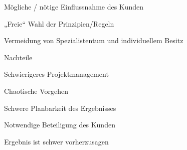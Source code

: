 \documentclass[a4paper]{article}
\begin{document}
\begin{multicols}{3}
\begin{itemize*}
\begin{itemize*}
      \item Mögliche / nötige Einflussnahme des Kunden
      \item „Freie“ Wahl der Prinzipien/Regeln
      \item Vermeidung von Spezialistentum und individuellem Besitz
    \end{itemize*}
    \item Nachteile
    \begin{itemize*}
      \item Schwierigeres Projektmanagement
      \begin{itemize*}
        \item Chaotische Vorgehen
        \item Schwere Planbarkeit des Ergebnisses
      \end{itemize*}
      \item Notwendige Beteiligung des Kunden
      \item Ergebnis ist schwer vorherzusagen
    \end{itemize*}
  \end{itemize*}


\end{multicols}
\end{document}
